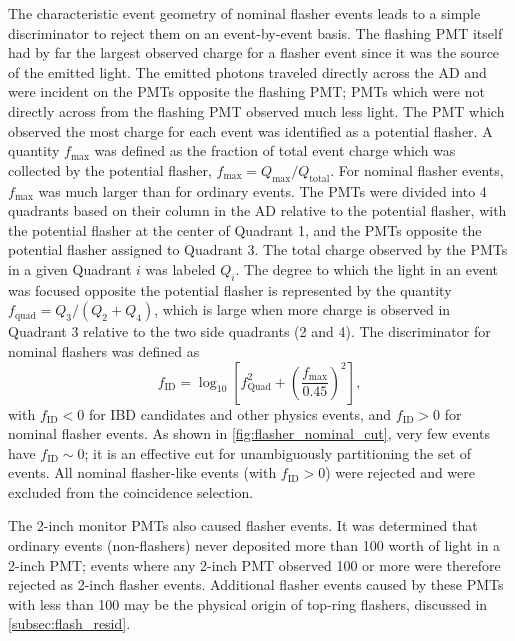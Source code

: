 The characteristic event geometry of nominal flasher events
leads to a simple discriminator to reject them on an event-by-event basis.
The flashing PMT itself had by far the largest observed charge
for a flasher event since it was the source of the emitted light.
The emitted photons traveled directly across the AD
and were incident on the PMTs opposite the flashing PMT;
PMTs which were not directly across from the flashing PMT
observed much less light.
The PMT which observed the most charge for each event
was identified as a potential flasher.
A quantity $f_{\text{max}}$ was defined as the fraction of total event charge
which was collected by the potential flasher,
$f_{\text{max}} = Q_{\text{max}}/Q_{\text{total}}$.
For nominal flasher events, $f_{\text{max}}$ was much larger than for ordinary events.
The PMTs were divided into 4 quadrants based on their column in the AD
relative to the potential flasher,
with the potential flasher at the center of Quadrant 1,
and the PMTs opposite the potential flasher assigned to Quadrant 3.
The total charge observed by the PMTs in a given Quadrant $i$
was labeled $Q_i$.
The degree to which the light in an event was focused
opposite the potential flasher
is represented by the quantity $f_{\text{quad}} = Q_3/(Q_2 + Q_4)$,
which is large when more charge is observed in Quadrant 3
relative to the two side quadrants (2 and 4).
The discriminator for nominal flashers was defined as
\begin{equation}
    f_{\text{ID}} = \log_{10}\left[
        f_{\text{Quad}}^2 + \left(
            \frac{f_{\text{max}}}{0.45}
        \right)^2
    \right],
\end{equation}
with $f_{\text{ID}} < 0$ for IBD candidates and other physics events,
and $f_{\text{ID}} > 0$ for nominal flasher events.
As shown in \cref{fig:flasher_nominal_cut},
very few events have $f_{\text{ID}}\sim0$;
it is an effective cut for unambiguously partitioning the set of events.
All nominal flasher-like events (with $f_{\text{ID}} > 0$) were rejected
and were excluded from the coincidence selection.

The 2-inch monitor PMTs also caused flasher events.
It was determined that ordinary events (non-flashers)
never deposited more than \SI{100}{\pe} worth of light
in a 2-inch PMT;
events where any 2-inch PMT observed \SI{100}{\pe} or more
were therefore rejected as 2-inch flasher events.
Additional flasher events caused by these PMTs with less than \SI{100}{\pe}
may be the physical origin of top-ring flashers,
discussed in \cref{subsec:flash_resid}.

